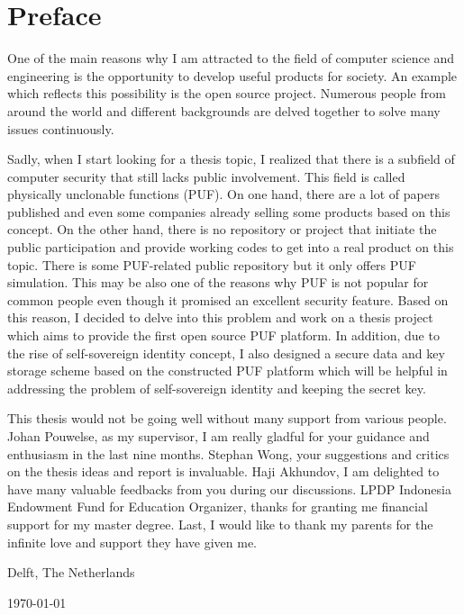 \chapter*{Preface}
One of the main reasons why I am attracted to the field of computer science and engineering is the opportunity to develop useful products for society. An example which reflects this possibility is the open source project. Numerous people from around the world and different backgrounds are delved together to solve many issues continuously.

Sadly, when I start looking for a thesis topic, I realized that there is a subfield of computer security that still lacks public involvement. This field is called physically unclonable functions (PUF). On one hand, there are a lot of papers published and even some companies already selling some products based on this concept. On the other hand, there is no repository or project that initiate the public participation and provide working codes to get into a real product on this topic. There is some PUF-related public repository but it only offers PUF simulation. This may be also one of the reasons why PUF is not popular for common people even though it promised an excellent security feature. Based on this reason, I decided to delve into this problem and work on a thesis project which aims to provide the first open source PUF platform. In addition, due to the rise of self-sovereign identity concept, I also designed a secure data and key storage scheme based on the constructed PUF platform which will be helpful in addressing the problem of self-sovereign identity and keeping the secret key.
\vspace{1\baselineskip}

\noindent
This thesis would not be going well without many support from various people. Johan Pouwelse, as my supervisor, I am really gladful for your guidance and enthusiasm in the last nine months.  Stephan Wong, your suggestions and critics on the thesis ideas and report is invaluable. Haji Akhundov, I am delighted to have many valuable feedbacks from you during our discussions.
LPDP Indonesia Endowment Fund for Education Organizer, thanks for granting me financial support for my master degree. Last, I would like to thank my parents for the infinite love and support they have given me.

\vspace{1\baselineskip}

\noindent
\reportAuthor

\vspace{1\baselineskip}

\noindent
Delft, The Netherlands

\noindent
\today
